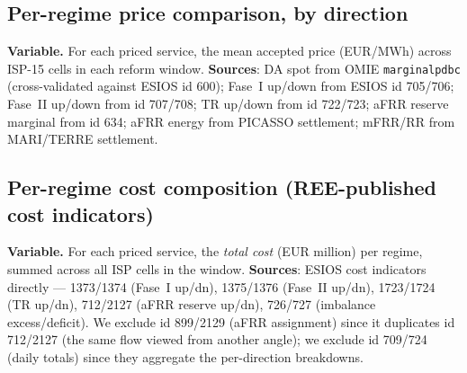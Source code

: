 \documentclass[11pt,a4paper]{article}
\begin{document}
\subsection{Per-regime price comparison, by direction}\label{sec:prov:full_cascade:prices}

\textbf{Variable.} For each priced service, the mean accepted price (EUR/MWh) across ISP-15 cells in each reform window. \textbf{Sources}: DA spot from OMIE \texttt{marginalpdbc} (cross-validated against ESIOS id 600); Fase~I up/down from ESIOS id 705/706; Fase~II up/down from id 707/708; TR up/down from id 722/723; aFRR reserve marginal from id 634; aFRR energy from PICASSO settlement; mFRR/RR from MARI/TERRE settlement.

\begin{table}[H]
\centering\scriptsize
\caption{\textbf{Per-regime average UP price by service, EUR/MWh.} ``---'' = no data in window. Sources: ESIOS indicator IDs cited inline in the section preamble; arithmetic mean across ISP-15 cells in each regime window.}
\label{tab:cascade_prices_up}
\setlength{\tabcolsep}{4pt}

\end{table}

\begin{table}[H]
\centering\scriptsize
\caption{\textbf{Per-regime average DOWN price by service, EUR/MWh.} A negative value means REE \emph{pays} the unit per MWh reduced (the unit's revenue is positive, REE's cash flow is out).}
\label{tab:cascade_prices_dn}
\setlength{\tabcolsep}{4pt}

\end{table}

\subsection{Per-regime cost composition (REE-published cost indicators)}\label{sec:prov:full_cascade:costs}

\textbf{Variable.} For each priced service, the \emph{total cost} (EUR million) per regime, summed across all ISP cells in the window. \textbf{Sources}: ESIOS cost indicators directly --- 1373/1374 (Fase~I up/dn), 1375/1376 (Fase~II up/dn), 1723/1724 (TR up/dn), 712/2127 (aFRR reserve up/dn), 726/727 (imbalance excess/deficit). We exclude id 899/2129 (aFRR assignment) since it duplicates id 712/2127 (the same flow viewed from another angle); we exclude id 709/724 (daily totals) since they aggregate the per-direction breakdowns.
\end{document}

